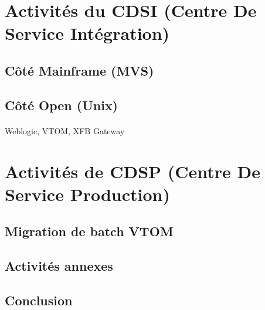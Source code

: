 \documentclass[a4paper,12pt]{report}
\begin{document}
	\paragraph*{}
	
	
\newpage	
\section{Activités du CDSI (Centre De Service Intégration)}
	\subsection{Côté Mainframe (MVS)}
	\paragraph*{}
	
	
	\subsection{Côté Open (Unix)}
	\paragraph*{}
	Weblogic, VTOM, XFB Gateway 
	
\newpage	
\section{Activités de CDSP (Centre De Service Production)}
	\subsection{Migration de batch VTOM}
	\paragraph*{}
	
	
	\subsection{Activités annexes}
	\paragraph*{}
	
	
\newpage	
\begin{center}
\section*{Conclusion}
\end{center}
\paragraph*{}
\end{document}

